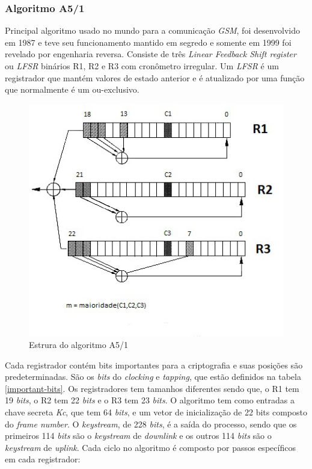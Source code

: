 \subsubsection{Algoritmo A5/1}
\label{algorithm-a51}

Principal algoritmo usado no mundo para a comunicação \textit{GSM}, foi desenvolvido em 1987 e teve seu funcionamento mantido em segredo e somente em 1999 foi revelado por engenharia reversa. Consiste de três \textit{Linear Feedback Shift register} ou \textit{LFSR} binários R1, R2 e R3 com cronômetro irregular. Um \textit{LFSR} é um registrador que mantém valores de estado anterior e é atualizado por uma função que normalmente é um ou-exclusivo. 

\begin{figure}[h]
\centering
\includegraphics[keepaspectratio=true,scale=0.9]
    {figuras/a5_1.eps}
    \caption[Estrura do algoritmo A5/1]{Estrura do algoritmo A5/1\protect\footnotemark} 
\end{figure}

Cada registrador contém bits importantes para a criptografia e suas posições são predeterminadas. São os \textit{bits} do \textit{clocking} e \textit{tapping}, que estão definidos na tabela \ref{important-bits}. Os registradores tem tamanhos diferentes sendo que, o R1 tem 19 \textit{bits}, o R2 tem 22 \textit{bits} e o R3 tem 23 \textit{bits}. O algoritmo tem como entradas a chave secreta \textit{Kc}, que tem 64 \textit{bits}, e um vetor de inicialização de 22 bits composto do \textit{frame number}. O \textit{keystream}, de 228 \textit{bits}, é a saída do processo, sendo que os primeiros 114 \textit{bits} são o \textit{keystream} de \textit{downlink} e os outros 114 \textit{bits} são o \textit{keystream} de \textit{uplink}. Cada ciclo no algoritmo é composto por passos específicos em cada registrador:

